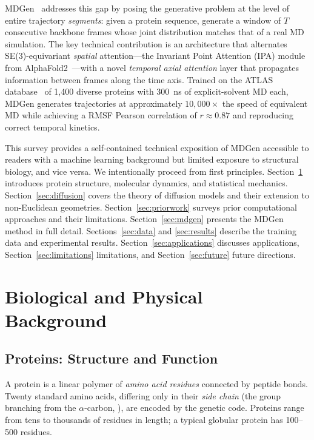 \documentclass[11pt,a4paper]{article}
\begin{document}
MDGen~\cite{jing2024mdgen} addresses this gap by posing the generative problem at the level of
entire trajectory \emph{segments}: given a protein sequence, generate a window of $T$ consecutive
backbone frames whose joint distribution matches that of a real MD simulation.  The key technical
contribution is an architecture that alternates SE(3)-equivariant \emph{spatial} attention---the
Invariant Point Attention (IPA) module from AlphaFold2~\cite{jumper2021}---with a novel
\emph{temporal axial attention} layer that propagates information between frames along the time
axis.  Trained on the ATLAS database~\cite{vandermeersche2024} of 1,400 diverse proteins with
300~ns of explicit-solvent MD each, MDGen generates trajectories at approximately $10{,}000\times$
the speed of equivalent MD while achieving a RMSF Pearson correlation of $r \approx 0.87$ and
reproducing correct temporal kinetics.

This survey provides a self-contained technical exposition of MDGen accessible to readers with a
machine learning background but limited exposure to structural biology, and vice versa.  We
intentionally proceed from first principles.  Section~\ref{sec:background} introduces protein
structure, molecular dynamics, and statistical mechanics.  Section~\ref{sec:diffusion} covers the
theory of diffusion models and their extension to non-Euclidean geometries.
Section~\ref{sec:priorwork} surveys prior computational approaches and their limitations.
Section~\ref{sec:mdgen} presents the MDGen method in full detail.  Sections~\ref{sec:data} and
\ref{sec:results} describe the training data and experimental results.  Section~\ref{sec:applications}
discusses applications, Section~\ref{sec:limitations} limitations, and Section~\ref{sec:future}
future directions.


\section{Biological and Physical Background}
\label{sec:background}

\subsection{Proteins: Structure and Function}

A protein is a linear polymer of \emph{amino acid residues} connected by peptide bonds.  Twenty
standard amino acids, differing only in their \emph{side chain} (the group branching from the
$\alpha$-carbon, ), are encoded by the genetic code.  Proteins range from tens
to thousands of residues in length; a typical globular protein has 100--500 residues.
\end{document}
